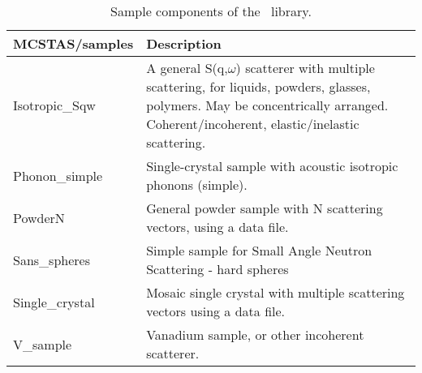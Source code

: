 \begin{table}
  \begin{center}
    {\let\my=\\
    \begin{tabular}{|p{}|p{}|}
      \hline
       {\bf MCSTAS/samples} & Description \\
       \hline
  Isotropic\_Sqw & A general S(q,$\omega$) scatterer with multiple scattering, for liquids, powders, glasses, polymers. May be concentrically arranged. Coherent/incoherent, elastic/inelastic scattering. \\
  Phonon\_simple   & Single-crystal sample with acoustic isotropic phonons (simple). \\
  PowderN      &  General powder sample with N
                scattering vectors, using a data file. \\
  Sans\_spheres  & Simple sample for Small Angle Neutron Scattering - hard spheres \\
  Single\_crystal & Mosaic single crystal with multiple scattering vectors
                    using a data file. \\
  V\_sample      & Vanadium sample, or other incoherent scatterer.\\ \hline
    \end{tabular}
    \caption{Sample components of the \MCS\ library.}
    \label{t:comp-samples}
    }
  \end{center}
\end{table}

